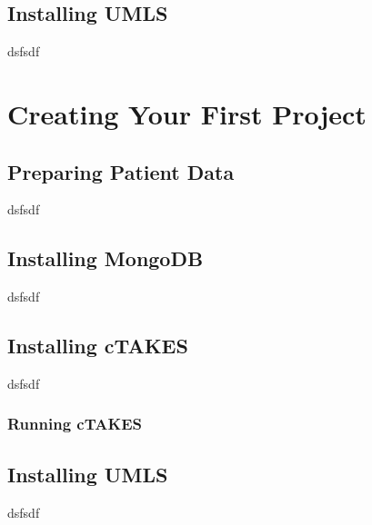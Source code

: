 \documentclass{book}
\begin{document}
\section{Installing UMLS}
dsfsdf


\chapter{Creating Your First Project}
\section{Preparing Patient Data}
dsfsdf

\section{Installing MongoDB}
dsfsdf

\section{Installing cTAKES}
dsfsdf
\subsection{Running cTAKES}
\section{Installing UMLS}
dsfsdf
\end{document}
